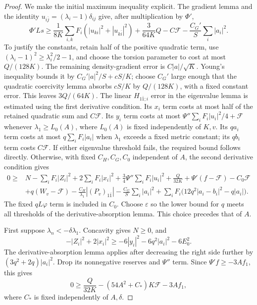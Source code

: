\begin{proof}
We make the initial maximum inequality explicit. The gradient lemma and the identity $u_{i\bar j}=(\lambda_i-1)\delta_{ij}$ give, after multiplication by $\Phi'$,
\[
 \Phi'Ls\geq\frac1{8K}\sum_{i,k}F_i(|u_{ki}|^2+|u_{k\bar i}|^2)
             +\frac{3}{64K}Q-C\mathcal F
             -\frac{C_G'}S\sum_i|a_i|^2.
\]
To justify the constants, retain half of the positive quadratic term, use $(\lambda_i-1)^2\geq\lambda_i^2/2-1$, and choose the torsion parameter to cost at most $Q/(128K)$. The remaining density-gradient error is $C|a|/\sqrt K$. Young's inequality bounds it by $C_G'|a|^2/S+cS/K$; choose $C_G'$ large enough that the quadratic coercivity lemma absorbs $cS/K$ by $Q/(128K)$, with a fixed constant error. This leaves $3Q/(64K)$.
The linear $H_{1\bar1;i}$ error in the eigenvalue lemma is estimated using the first derivative condition. Its $x_i$ term costs at most half of the retained quadratic sum and $C\mathcal F$. Its $y_i$ term costs at most $\Psi''\sum_iF_i|u_i|^2/4+\mathcal F$ whenever $\lambda_1\geq L_0(A)$, where $L_0(A)$ is fixed independently of $K,v$. Its $qa_i$ term costs at most $q\sum_iF_i|a_i|$ when $\lambda_1$ exceeds a fixed metric constant; its $qb_i$ term costs $C\mathcal F$.
If either eigenvalue threshold fails, the required bound follows directly. Otherwise, with fixed $C_H,C_G,C_0$ independent of $A$, the second derivative condition gives
\begin{align*}
 0\geq{}&N-\sum_iF_i|Z_i|^2+2\sum_iF_i|x_i|^2
       +\tfrac34\Psi''\sum_iF_i|u_i|^2+\frac{Q}{32K}
       +\Psi'(f-\mathcal F)-C_0\mathcal F\\
 &+q(W_v-\mathcal F)-\frac{C_H}{\lambda_1}|(P_v)_{1\bar1}|
       -\frac{C_G}S\sum_i|a_i|^2
       +\sum_iF_i\bigl(12q^2|a_i-b_i|^2-q|a_i|\bigr).
\end{align*}
The fixed $qL\varphi$ term is included in $C_0$. Choose $\varepsilon$ so the lower bound for $q$ meets all thresholds of the derivative-absorption lemma. This choice precedes that of $A$.

First suppose $\lambda_n<-\delta\lambda_1$. Concavity gives $N\geq0$, and
\[
 -|Z_i|^2+2|x_i|^2
     \geq-6|y_i|^2-6q^2|a_i|^2-6E_0^2.
\]
The derivative-absorption lemma applies after decreasing the right side further by $(3q^2+2q)|a_i|^2$. Drop its nonnegative reserves and $\Psi''$ term. Since $\Psi'f\geq-3Af_1$, this gives
\[
 0\geq\frac{Q}{32K}-(54A^2+C_*)K\mathcal F-3Af_1,
\]
where $C_*$ is fixed independently of $A,\delta$.


\end{proof}
